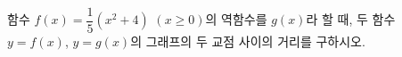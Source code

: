 함수 $f(x)=\dfrac{1}{5}(x^2+4)$ $(x\ge 0)$의 역함수를 $g(x)$라 할 때, 두 함수 $y=f(x)$, $y=g(x)$의 그래프의 두 교점 사이의 거리를 구하시오.
